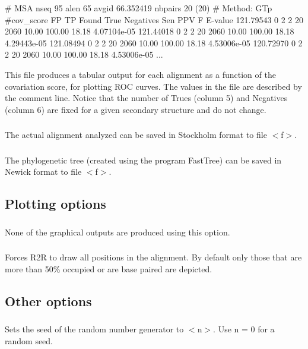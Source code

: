\begin{sreoutput}
# MSA nseq 95 alen 65 avgid 66.352419 nbpairs 20 (20)
# Method: GTp
#cov_score  FP  TP Found  True  Negatives  Sen   PPV     F       E-value
121.79543   0   2  2      20    2060       10.00 100.00  18.18   4.07104e-05
121.44018   0   2  2      20    2060       10.00 100.00  18.18   4.29443e-05
121.08494   0   2  2      20    2060       10.00 100.00  18.18   4.53006e-05
120.72970   0   2  2      20    2060       10.00 100.00  18.18   4.53006e-05
...
\end{sreoutput}

This file produces a tabular output for each alignment as a function
of the covariation score, for plotting ROC curves. The values in the
file are described by the comment line. Notice that the number of
Trues (column 5) and Negatives (column 6) are fixed for a given
secondary structure and do not change.

\subsubsection{} The actual alignment analyzed can be saved in Stockholm format to file $<$f$>$.

\subsubsection{} The phylogenetic tree (created using the program FastTree) can be saved in Newick format to file $<$f$>$.


\subsection{Plotting options}

\subsubsection{} None of the graphical outputs are produced using this option.


\subsubsection{} Forces R2R to draw all positions in the alignment. By default only
those that are more than 50\% occupied or are base paired are
depicted.


\subsection{Other options}

\subsubsection{} Sets the seed of the random number generator to $<$n$>$. Use n = 0 for a random seed.










